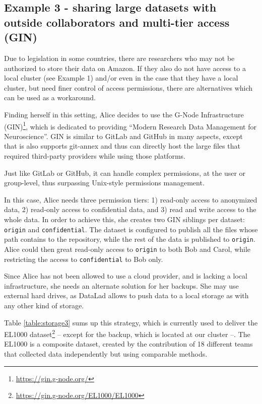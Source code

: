 \documentclass[smallextended]{svjour3}       %
\begin{document}
\subsection{Example 3 - sharing large datasets with outside collaborators  and multi-tier access (GIN)}\label{appendix:gin}

Due to legislation in some countries, there are researchers who may not be authorized to store their data on Amazon. If they also do not have access to a local cluster (see Example 1) and/or even in the case that they have a local cluster, but need finer control of access permissions, there are alternatives which can be used as a workaround.

Finding herself in this setting, Alice decides to use the G-Node Infrastructure (GIN)\footnote{\url{https://gin.g-node.org/}}, which is dedicated to providing ``Modern Research Data Management for Neuroscience''. GIN is similar to GitLab and GitHub in many aspects, except that is also supports git-annex and thus can directly host the large files that required third-party providers while using those platforms.

Just like GitLab or GitHub, it can handle complex permissions, at the user or group-level, thus surpassing Unix-style permissions management.

In this case, Alice needs three permission tiers: 1) read-only access to anonymized data, 2) read-only access to confidential data, and 3) read and write access to the whole data. In order to achieve this, she creates two GIN siblings per dataset: \texttt{origin} and \texttt{confidential}. The dataset is configured to publish all the files whose path contains  to the  repository, while the rest of the data is published to \texttt{origin}. Alice could then great read-only access to \texttt{origin} to both Bob and Carol, while restricting the access to \texttt{confidential} to Bob only.

Since Alice has not been allowed to use a cloud provider, and is lacking a local infrastructure, she needs an alternate solution for her backups. She may use external hard drives, as DataLad allows to push data to a local storage as with any other kind of storage.

Table \ref{table:storage3} sums up this strategy, which is currently used to deliver the EL1000 dataset\footnote{\url{https://gin.g-node.org/EL1000/EL1000}} -- except for the backup, which is located at our cluster --. The EL1000 is a composite dataset, created by the contribution of 18 different teams that collected data independently but using comparable methods.
\end{document}
